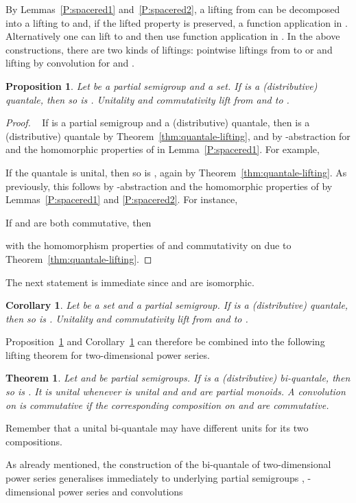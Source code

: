 \documentclass[12pt]{article}
\newtheorem{theorem}{Theorem}
\newtheorem{proposition}{Proposition}
\newtheorem{corollary}{Corollary}
\theoremstyle{definition}
\newcommand{\refthm}[1]{Theorem~\ref{#1}}
\begin{document}
By Lemmas~\ref{P:spacered1} and~\ref{P:spacered2}, a lifting from 
can be decomposed into a lifting to  and, if the lifted
property is preserved, a function application in
. Alternatively one can lift to  and then
use function application in . In the above
constructions, there are two kinds of liftings: pointwise liftings
from  to  or  and lifting by convolution for
 and .

\begin{proposition}\label{prop:seq-lifting}
  Let  be a partial semigroup and  a set.  If
   is a (distributive) quantale, then so is
  . Unitality and commutativity lift
  from  and  to .
\end{proposition}
\begin{proof}~ If  is a partial semigroup and  a
  (distributive) quantale, then  is a (distributive) quantale
  by \refthm{thm:quantale-lifting}, and by -abstraction for
   and the homomorphic properties of  in
  Lemma~\ref{P:spacered1}. For example,
  
  If the quantale  is unital, then so is , again by
  \refthm{thm:quantale-lifting}. As previously, this follows by
  -abstraction and the homomorphic properties of  by
  Lemmas~\ref{P:spacered1} and \ref{P:spacered2}. For instance,
  
  If  and  are both commutative, then 
  
  with the homomorphism properties of  and commutativity on
   due to \refthm{thm:quantale-lifting}.
\end{proof}
The next statement is immediate since
 and  are isomorphic.
\begin{corollary}\label{cor:conc-lifting} 
  Let  be a set and  a partial semigroup. If
   is a (distributive) quantale, then so is
  . Unitality and commutativity lift
  from   and  to .
\end{corollary}
Proposition~\ref{prop:seq-lifting} and
Corollary~\ref{cor:conc-lifting} can therefore be combined into the
following lifting theorem for two-dimensional  power series.
\begin{theorem}\label{thm:biquantale}
  Let  and  be partial semigroups. If
   is a (distributive) bi-quantale, then so is
  . It is unital whenever 
  is unital and  and  are partial monoids. A convolution on
   is commutative if the corresponding composition
  on  and  are commutative.
\end{theorem}
Remember that a unital bi-quantale may have different units for its
two compositions.

As already mentioned, the construction of the bi-quantale of
two-dimensional power series generalises immediately to  underlying
partial semigroups , -dimensional power series
 and convolutions
\end{document}
